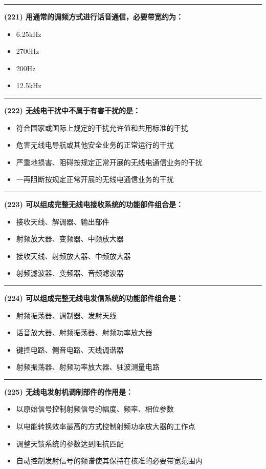 \documentclass[twocolumn]{ctexart}  %
\begin{document}
\noindent\rule{0.5\textwidth}{1pt}
\heiti \textbf{(221) 用通常的调频方式进行话音通信，必要带宽约为：} \songti {\color{gray} [LK0123] }
\begin{itemize}
	\item  6.25kHz
	\item  2700Hz
	\item  200Hz
	\item  12.5kHz
\end{itemize}


\noindent\rule{0.5\textwidth}{1pt}
\heiti \textbf{(222) 无线电干扰中不属于有害干扰的是：} \songti {\color{gray} [LK0138] }
\begin{itemize}
	\item  符合国家或国际上规定的干扰允许值和共用标准的干扰
	\item  危害无线电导航或其他安全业务的正常运行的干扰
	\item  严重地损害、阻碍按规定正常开展的无线电通信业务的干扰
	\item  一再阻断按规定正常开展的无线电通信业务的干扰
\end{itemize}


\noindent\rule{0.5\textwidth}{1pt}
\heiti \textbf{(223) 可以组成完整无线电接收系统的功能部件组合是：} \songti {\color{gray} [LK0416] }
\begin{itemize}
	\item  接收天线、解调器、输出部件
	\item  射频放大器、变频器、中频放大器
	\item  接收天线、射频放大器、中频放大器
	\item  射频滤波器、变频器、音频滤波器
\end{itemize}


\noindent\rule{0.5\textwidth}{1pt}
\heiti \textbf{(224) 可以组成完整无线电发信系统的功能部件组合是：} \songti {\color{gray} [LK0417] }
\begin{itemize}
	\item  射频振荡器、调制器、发射天线
	\item  话音放大器、射频振荡器、射频功率放大器
	\item  键控电路、侧音电路、天线调谐器
	\item  射频振荡器、射频功率放大器、驻波测量电路
\end{itemize}


\noindent\rule{0.5\textwidth}{1pt}
\heiti \textbf{(225) 无线电发射机调制部件的作用是：} \songti {\color{gray} [LK0418] }
\begin{itemize}
	\item  以原始信号控制射频信号的幅度、频率、相位参数
	\item  以电能转换效率最高的方式控制射频功率放大器的工作点
	\item  调整天馈系统的参数达到阻抗匹配
	\item  自动控制发射信号的频谱使其保持在核准的必要带宽范围内
\end{itemize}
\end{document}
